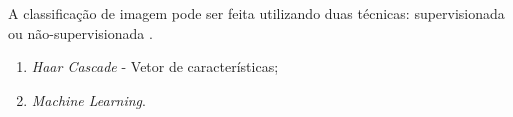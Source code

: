 A classificação de imagem pode ser feita utilizando duas técnicas: supervisionada ou não-supervisionada \cite{LIBERMAN97}.

\begin{enumerate}
    \item<1> \textit{Haar Cascade} - Vetor de características;
    \item<1> \textit{Machine Learning}.
\end{enumerate}